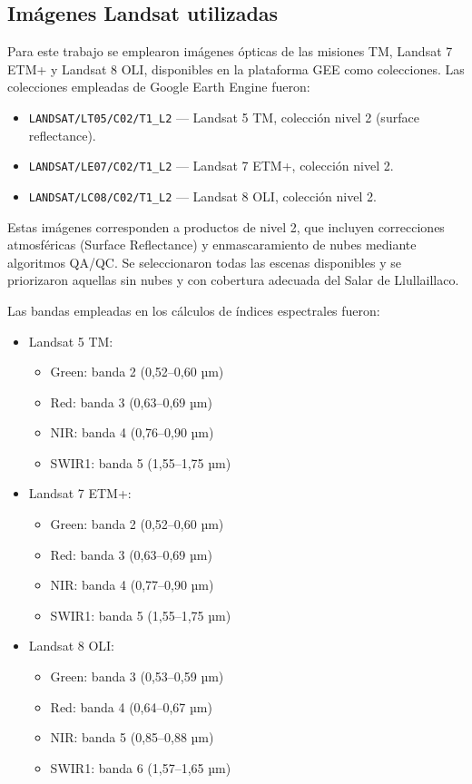 \subsection*{Imágenes Landsat utilizadas}

Para este trabajo se emplearon imágenes ópticas de las misiones  TM, Landsat 7 ETM+ y Landsat 8 OLI, disponibles en la plataforma GEE como colecciones. Las colecciones empleadas de Google Earth Engine fueron:

\begin{itemize}
    \item \texttt{LANDSAT/LT05/C02/T1\_L2} — Landsat 5 TM, colección nivel 2 (surface reflectance).
    \item \texttt{LANDSAT/LE07/C02/T1\_L2} — Landsat 7 ETM+, colección nivel 2.
    \item \texttt{LANDSAT/LC08/C02/T1\_L2} — Landsat 8 OLI, colección nivel 2.
\end{itemize}

Estas imágenes corresponden a productos de nivel 2, que incluyen correcciones atmosféricas (Surface Reflectance) y enmascaramiento de nubes mediante algoritmos QA/QC. Se seleccionaron todas las escenas disponibles y se priorizaron aquellas sin nubes y con cobertura adecuada del Salar de Llullaillaco.

Las bandas empleadas en los cálculos de índices espectrales fueron:

\begin{itemize}
    \item Landsat 5 TM:
    \begin{itemize}
        \item Green: banda 2 (0,52–0,60 µm)
        \item Red: banda 3 (0,63–0,69 µm)
        \item NIR: banda 4 (0,76–0,90 µm)
        \item SWIR1: banda 5 (1,55–1,75 µm)
    \end{itemize}
    
    \item Landsat 7 ETM+:
    \begin{itemize}
        \item Green: banda 2 (0,52–0,60 µm)
        \item Red: banda 3 (0,63–0,69 µm)
        \item NIR: banda 4 (0,77–0,90 µm)
        \item SWIR1: banda 5 (1,55–1,75 µm)
    \end{itemize}

    \item Landsat 8 OLI:
    \begin{itemize}
        \item Green: banda 3 (0,53–0,59 µm)
        \item Red: banda 4 (0,64–0,67 µm)
        \item NIR: banda 5 (0,85–0,88 µm)
        \item SWIR1: banda 6 (1,57–1,65 µm)
    \end{itemize}
\end{itemize}


